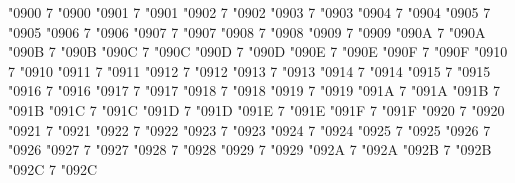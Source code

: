 \newcommand*{\chemDelta}{\textrm{Δ}}
\newcommand*{\chemEpsilon}{\textrm{Ε}}
\newcommand*{\chemZeta}{\textrm{Ζ}}
\newcommand*{\chemEta}{\textrm{Η}}
\newcommand*{\chemTheta}{\textrm{Θ}}
\newcommand*{\chemIota}{\textrm{Ι}}
\newcommand*{\chemKappa}{\textrm{Κ}}
\newcommand*{\chemLambda}{\textrm{Λ}}
\newcommand*{\chemMu}{\textrm{Μ}}
\newcommand*{\chemNu}{\textrm{Ν}}
\newcommand*{\chemXi}{\textrm{Ξ}}
\newcommand*{\chemOmicron}{\textrm{Ο}}
\newcommand*{\chemPi}{\textrm{Π}}
\newcommand*{\chemRho}{\textrm{Ρ}}
\newcommand*{\chemSigma}{\textrm{Σ}}
\newcommand*{\chemTau}{\textrm{Τ}}
\newcommand*{\chemUpsilon}{\textrm{Υ}}
\newcommand*{\chemPhi}{\textrm{Φ}}
\newcommand*{\chemChi}{\textrm{Χ}}
\newcommand*{\chemPsi}{\textrm{Ψ}}
\newcommand*{\chemOmega}{\textrm{Ω}}
%
\Umathcode "0900 7 \symoperators "0900%
\Umathcode "0901 7 \symoperators "0901%
\Umathcode "0902 7 \symoperators "0902%
\Umathcode "0903 7 \symoperators "0903%
\Umathcode "0904 7 \symoperators "0904%
\Umathcode "0905 7 \symoperators "0905%
\Umathcode "0906 7 \symoperators "0906%
\Umathcode "0907 7 \symoperators "0907%
\Umathcode "0908 7 \symoperators "0908%
\Umathcode "0909 7 \symoperators "0909%
\Umathcode "090A 7 \symoperators "090A%
\Umathcode "090B 7 \symoperators "090B%
\Umathcode "090C 7 \symoperators "090C%
\Umathcode "090D 7 \symoperators "090D%
\Umathcode "090E 7 \symoperators "090E%
\Umathcode "090F 7 \symoperators "090F%
%
\Umathcode "0910 7 \symoperators "0910%
\Umathcode "0911 7 \symoperators "0911%
\Umathcode "0912 7 \symoperators "0912%
\Umathcode "0913 7 \symoperators "0913%
\Umathcode "0914 7 \symoperators "0914%
\Umathcode "0915 7 \symoperators "0915%
\Umathcode "0916 7 \symoperators "0916%
\Umathcode "0917 7 \symoperators "0917%
\Umathcode "0918 7 \symoperators "0918%
\Umathcode "0919 7 \symoperators "0919%
\Umathcode "091A 7 \symoperators "091A%
\Umathcode "091B 7 \symoperators "091B%
\Umathcode "091C 7 \symoperators "091C%
\Umathcode "091D 7 \symoperators "091D%
\Umathcode "091E 7 \symoperators "091E%
\Umathcode "091F 7 \symoperators "091F%
%
\Umathcode "0920 7 \symoperators "0920%
\Umathcode "0921 7 \symoperators "0921%
\Umathcode "0922 7 \symoperators "0922%
\Umathcode "0923 7 \symoperators "0923%
\Umathcode "0924 7 \symoperators "0924%
\Umathcode "0925 7 \symoperators "0925%
\Umathcode "0926 7 \symoperators "0926%
\Umathcode "0927 7 \symoperators "0927%
\Umathcode "0928 7 \symoperators "0928%
\Umathcode "0929 7 \symoperators "0929%
\Umathcode "092A 7 \symoperators "092A%
\Umathcode "092B 7 \symoperators "092B%
\Umathcode "092C 7 \symoperators "092C%

